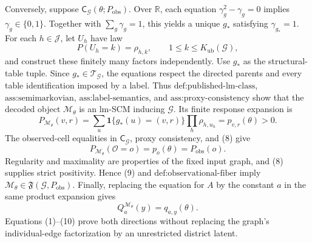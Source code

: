 Conversely, suppose \(\mathsf C_{\mathcal G}(\theta;P_{\mathrm{obs}})\). Over \(\mathbb R\), each equation \(\gamma_g^2-\gamma_g=0\) implies \(\gamma_g\in\{0,1\}\). Together with \(\sum_g\gamma_g=1\), this yields a unique \(g_*\) satisfying \(\gamma_{g_*}=1\). For each \(h\in\mathcal J\), let \(U_h\) have law
\[
P(U_h=k)=\rho_{h,k},
\qquad 1\leq k\leq K_{\mathrm{ub}}(\mathcal G),
\tag{7}
\]
and construct these finitely many factors independently. Use \(g_*\) as the structural-table tuple. Since \(g_*\in\mathcal T_{\mathcal G}\), the equations respect the directed parents and every table identification imposed by a label. Thus \(\text{def:published-lm-class}\), \(\text{ass:semimarkovian}\), \(\text{ass:label-semantics}\), and \(\text{ass:proxy-consistency}\) show that the decoded object \(\mathcal M_\theta\) is an lm-SCM inducing \(\mathcal G\). Its finite response expansion is
\[
P_{\mathcal M_\theta}(v,r)
=\sum_u\mathbf 1\{g_*(u)=(v,r)\}\prod_h\rho_{h,u_h}
=p_{v,r}(\theta)>0.
\tag{8}
\]
The observed-cell equalities in \(\mathsf C_{\mathcal G}\), proxy consistency, and (8) give
\[
P_{\mathcal M_\theta}(\mathcal O=o)=p_o(\theta)=P_{\mathrm{obs}}(o).
\tag{9}
\]
Regularity and maximality are properties of the fixed input graph, and (8) supplies strict positivity. Hence (9) and \(\text{def:observational-fiber}\) imply \(\mathcal M_\theta\in\mathfrak F(\mathcal G,P_{\mathrm{obs}})\). Finally, replacing the equation for \(A\) by the constant \(a\) in the same product expansion gives
\[
Q_a^{\mathcal M_\theta}(y)=q_{a,y}(\theta).
\tag{10}
\]
Equations (1)--(10) prove both directions without replacing the graph's individual-edge factorization by an unrestricted district latent.